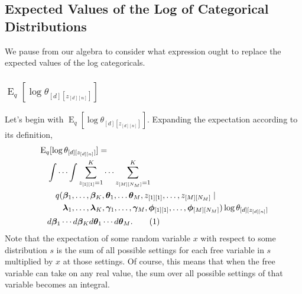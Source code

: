 \documentclass[12pt]{article}
\newcommand\numberthis{\addtocounter{equation}{1}\tag{\theequation}}
\newcommand{\E}{\operatorname{E}}
\begin{document}
\subsection{Expected Values of the Log of Categorical Distributions}

We pause from our algebra to consider what expression ought to replace the
expected values of the log categoricals.

\subsubsection{$\E_{q}[\log \theta_{[d][z_{[d][n]}]}]$}

Let's begin with $\E_{q}[\log \theta_{[d][z_{[d][n]}]}]$.  Expanding the
expectation according to its definition,
\begin{align*}
    &\E_{q}[\log \theta_{[d][z_{[d][n]}]}] = \\
    &\quad\int \cdots \int
    \sum_{z_{[1][1]}=1}^{K} \cdots \sum_{z_{[M][N_{M}]}=1}^{K} \\
    &\quad\quad\begin{aligned} q(&\bm{\beta}_{1}, \ldots, \bm{\beta}_{K},
    \bm{\theta}_{1}, \ldots \bm{\theta}_{M}, z_{[1][1]}, \ldots, z_{[M][N_{M}]}
    \mid \\*
    & \bm{\lambda}_{1}, \ldots, \bm{\lambda}_{K}, \bm{\gamma}_{1}, \ldots,
    \bm{\gamma}_{M}, \bm{\phi}_{[1][1]}, \ldots, \bm{\phi}_{[M][N_{M}]})\log
    \theta_{[d][z_{[d][n]}]}
    \end{aligned} \\
    &\quad d\bm{\beta}_{1}\cdots d\bm{\beta}_{K}d\bm{\theta}_{1}\cdots
    d\bm{\theta}_{M}.
    \numberthis
\end{align*}
Note that the expectation of some random variable $x$ with respect to some
distribution $s$ is the sum of all possible settings for each free variable in
$s$ multiplied by $x$ at those settings.  Of course, this means that when the
free variable can take on any real value, the sum over all possible settings of
that variable becomes an integral.
\end{document}
